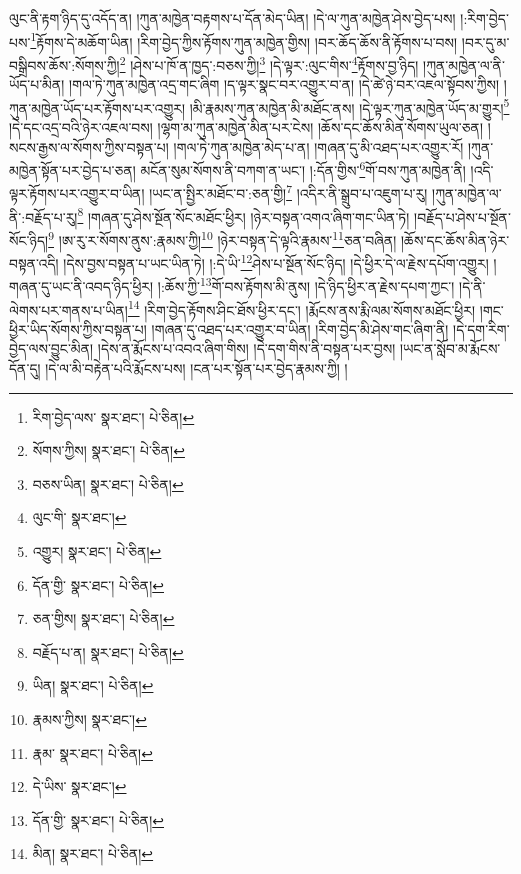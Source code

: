 ལུང་ནི་རྟག་ཉིད་དུ་འདོད་ན། །ཀུན་མཁྱེན་བརྟགས་པ་དོན་མེད་ཡིན། །དེ་ལ་ཀུན་མཁྱེན་ཤེས་བྱེད་པས། །:རིག་བྱེད་པས་\footnote{རིག་བྱེད་ལས་  སྣར་ཐང་།  པེ་ཅིན། }རྟོགས་དེ་མཆོག་ཡིན། །རིག་བྱེད་ཀྱིས་རྟོགས་ཀུན་མཁྱེན་གྱིས། །བར་ཆོད་ཆོས་ནི་རྟོགས་པ་བས། །བར་དུ་མ་བསྒྲིབས་ཆོས་:སོགས་ཀྱི།\footnote{སོགས་ཀྱིས།  སྣར་ཐང་།  པེ་ཅིན། } །ཤེས་པ་ཁོ་ན་ཁྱད་:བཅས་ཀྱི།\footnote{བཅས་ཡིན།  སྣར་ཐང་།  པེ་ཅིན། } །དེ་ལྟར་:ལུང་གིས་\footnote{ལུང་གི་  སྣར་ཐང་། }རྟོགས་བྱ་ཉིད། །ཀུན་མཁྱེན་ལ་ནི་ཡོད་པ་མིན། །གལ་ཏེ་ཀུན་མཁྱེན་འདྲ་གང་ཞིག །ད་ལྟར་སྣང་བར་འགྱུར་བ་ན། །དེ་ཚེ་ཉེ་བར་འཇལ་སྟོབས་ཀྱིས། །ཀུན་མཁྱེན་ཡོད་པར་རྟོགས་པར་འགྱུར། །མི་རྣམས་ཀུན་མཁྱེན་མི་མཐོང་ནས། །དེ་ལྟར་ཀུན་མཁྱེན་ཡོད་མ་གྱུར།\footnote{འགྱུར།  སྣར་ཐང་།  པེ་ཅིན། } །དེ་དང་འདྲ་བའི་ཉེར་འཇལ་བས། །ལྷག་མ་ཀུན་མཁྱེན་མིན་པར་ངེས། །ཆོས་དང་ཆོས་མིན་སོགས་ཡུལ་ཅན། །སངས་རྒྱས་ལ་སོགས་ཀྱིས་བསྟན་པ། །གལ་ཏེ་ཀུན་མཁྱེན་མེད་པ་ན། །གཞན་དུ་མི་འཐད་པར་འགྱུར་རོ། །ཀུན་མཁྱེན་སྟོན་པར་བྱེད་པ་ཅན། མངོན་སུམ་སོགས་ནི་བཀག་ན་ཡང་། །:དོན་གྱིས་\footnote{དོན་གྱི་  སྣར་ཐང་།  པེ་ཅིན། }གོ་བས་ཀུན་མཁྱེན་ནི། །འདི་ལྟར་རྟོགས་པར་འགྱུར་བ་ཡིན། །ཡང་ན་སྤྱིར་མཐོང་བ་:ཅན་གྱི།\footnote{ཅན་གྱིས།  སྣར་ཐང་།  པེ་ཅིན། } །འདིར་ནི་སྒྲུབ་པ་འཇུག་པ་རུ། །ཀུན་མཁྱེན་ལ་ནི་:བརྗོད་པ་རུ།\footnote{བརྗོད་པ་ན།  སྣར་ཐང་།  པེ་ཅིན། } །གཞན་དུ་ཤེས་སྔོན་སོང་མཐོང་ཕྱིར། །ཉེར་བསྟན་འགའ་ཞིག་གང་ཡིན་ཏེ། །བརྗོད་པ་ཤེས་པ་སྔོན་སོང་ཉིད།\footnote{ཡིན།  སྣར་ཐང་།  པེ་ཅིན། } །ཨ་རུ་ར་སོགས་ནུས་:རྣམས་ཀྱི།\footnote{རྣམས་ཀྱིས།  སྣར་ཐང་། } །ཉེར་བསྟན་དེ་ལྟའི་རྣམས་\footnote{རྣམ་  སྣར་ཐང་།  པེ་ཅིན། }ཅན་བཞིན། །ཆོས་དང་ཆོས་མིན་ཉེར་བསྟན་འདི། །དེས་བྱས་བསྟན་པ་ཡང་ཡིན་ཏེ། །:དེ་ཡི་\footnote{དེ་ཡིས་  སྣར་ཐང་། }ཤེས་པ་སྔོན་སོང་ཉིད། །དེ་ཕྱིར་དེ་ལ་རྗེས་དཔོག་འགྱུར། །གཞན་དུ་ཡང་ནི་འབད་ཉིད་ཕྱིར། །:ཆོས་ཀྱི་\footnote{དོན་གྱི་  སྣར་ཐང་།  པེ་ཅིན། }གོ་བས་རྟོགས་མི་ནུས། །དེ་ཉིད་ཕྱིར་ན་རྗེས་དཔག་ཀྱང་། །དེ་ནི་ལེགས་པར་གནས་པ་ཡིན།\footnote{མིན།  སྣར་ཐང་།  པེ་ཅིན། } །རིག་བྱེད་རྟོགས་ཤིང་ཐོས་ཕྱིར་དང་། །རྨོངས་ནས་རྨི་ལམ་སོགས་མཐོང་ཕྱིར། །གང་ཕྱིར་ཡིད་སོགས་ཀྱིས་བསྟན་པ། །གཞན་དུ་འཐད་པར་འགྱུར་བ་ཡིན། །རིག་བྱེད་མི་ཤེས་གང་ཞིག་ནི། །དེ་དག་རིག་བྱེད་ལས་བྱུང་མིན། །དེས་ན་རྨོངས་པ་འབའ་ཞིག་གིས། །དེ་དག་གིས་ནི་བསྟན་པར་བྱས། །ཡང་ན་སློབ་མ་རྨོངས་དོན་དུ། །དེ་ལ་མི་བརྟེན་པའི་རྨོངས་པས། །ངན་པར་སྟོན་པར་བྱེད་རྣམས་ཀྱི། །
